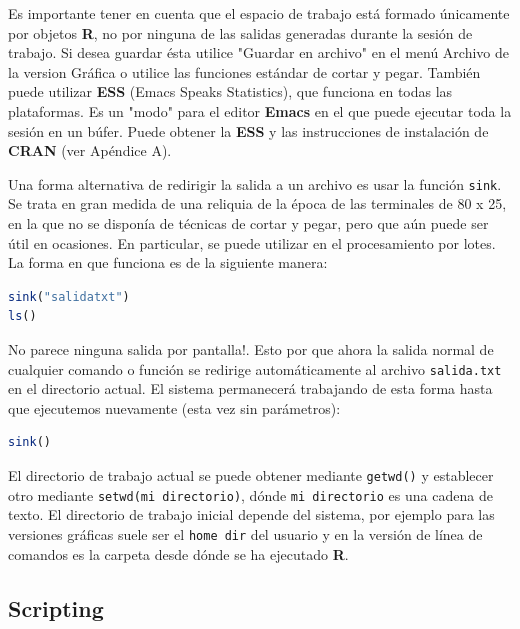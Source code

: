 \documentclass[spanish]{extbook}
\numberwithin{equation}{section}
\numberwithin{figure}{section}
\begin{document}
Es importante tener en cuenta que el espacio de trabajo está formado únicamente
por objetos \textbf{R}, no por ninguna de las salidas generadas durante la
sesión de trabajo.  Si desea guardar ésta utilice "Guardar en archivo" en el
menú Archivo de la version Gráfica o utilice las funciones estándar de cortar y
pegar. También puede utilizar \textbf{ESS} (Emacs Speaks Statistics), que
funciona en todas las plataformas. Es un "modo" para el editor \textbf{Emacs}
en el que puede ejecutar toda la sesión en un búfer. Puede obtener la
\textbf{ESS} y las instrucciones de instalación de \textbf{CRAN} (ver Apéndice
A).  

Una forma alternativa de redirigir la salida a un archivo es usar la función
\texttt{sink}. Se trata en gran medida de una reliquia de la época de las
terminales de 80 x 25, en la que no se disponía de técnicas de cortar y pegar,
pero que aún puede ser útil en ocasiones. En particular, se puede utilizar en
el procesamiento por lotes. La forma en que funciona es de la siguiente manera:

\begin{lstlisting}[language=R]
sink("salidatxt")
ls()
\end{lstlisting}

No parece ninguna salida por pantalla!. Esto por que ahora la salida normal de
cualquier comando o función se redirige automáticamente al archivo
\texttt{salida.txt} en el directorio actual.  El sistema permanecerá trabajando
de esta forma hasta que ejecutemos nuevamente (esta vez sin parámetros):

\begin{lstlisting}[language=R]
sink()
\end{lstlisting}

El directorio de trabajo actual se puede obtener mediante \texttt{getwd()} y
establecer otro mediante \texttt{setwd(mi directorio)}, dónde \texttt{mi
directorio} es una cadena de texto. El directorio de trabajo inicial depende
del sistema, por ejemplo para las versiones gráficas suele ser el \texttt{home
dir} del usuario y en la versión de línea de comandos es la carpeta desde dónde
se ha ejecutado \textbf{R}.

\subsection{Scripting}
\end{document}
